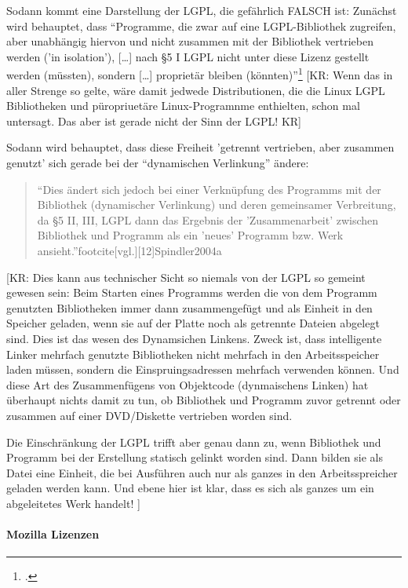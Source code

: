 \documentclass[DIV=calc,BCOR=5mm,11pt,headings=small,oneside,abstract=true, toc=bib]{scrartcl}
\begin{document}
Sodann kommt eine Darstellung der LGPL, die gefährlich FALSCH ist: Zunächst wird
behauptet, dass \enquote{Programme, die zwar auf eine LGPL-Bibliothek zugreifen,
aber unabhängig hiervon und nicht zusammen mit der Bibliothek vertrieben werden
('in isolation'), [\ldots] nach §5 I LGPL nicht unter diese
Lizenz gestellt werden (müssten), sondern [\ldots] proprietär
bleiben (könnten)}\footcite[vgl.][12]{Spindler2004a} [KR: Wenn das in
aller Strenge so gelte, wäre damit jedwede Distributionen, die die Linux LGPL
Bibliotheken und püropriuetäre Linux-Programnme enthielten, schon mal
untersagt. Das aber ist gerade nicht der Sinn der LGPL! KR]

Sodann wird behauptet, dass diese Freiheit 'getrennt vertrieben, aber zusammen
genutzt' sich gerade bei der \enquote{dynamischen Verlinkung} ändere: 
\begin{quote}\enquote{Dies ändert sich jedoch bei einer Verknüpfung des
Programms mit der Bibliothek (dynamischer Verlinkung) und deren
gemeinsamer Verbreitung, da §5 II, III, LGPL dann das Ergebnis der
'Zusammenarbeit' zwischen Bibliothek und Programm als ein 'neues'
Programm bzw. Werk ansieht.}footcite[vgl.][12]{Spindler2004a}
\end{quote}

[KR: Dies kann aus technischer Sicht so niemals von der LGPL so gemeint gewesen
sein: Beim Starten eines Programms werden die von dem Programm
genutzten Bibliotheken immer dann zusammengefügt und als Einheit in den Speicher
geladen, wenn sie auf der Platte noch als getrennte Dateien abgelegt sind. Dies
ist das wesen des Dynamsichen Linkens. Zweck ist, dass intelligente Linker
mehrfach genutzte Bibliotheken nicht mehrfach in den Arbeitsspeicher laden
müssen, sondern die Einspruingsadressen mehrfach verwenden können. Und diese Art
des Zusammenfügens von Objektcode (dynmaischens Linken) hat überhaupt nichts
damit zu tun, ob Bibliothek und Programm zuvor getrennt oder zusammen auf einer
DVD/Diskette vertrieben worden sind.

Die Einschränkung der LGPL trifft aber genau dann zu, wenn Bibliothek und
Programm bei der Erstellung statisch gelinkt worden sind. Dann bilden sie als
Datei eine Einheit, die bei Ausführen auch nur als ganzes in den
Arbeitsspreicher geladen werden kann. Und ebene hier ist klar, dass es sich als
ganzes um ein abgeleitetes Werk handelt!
 ]

\paragraph{Mozilla Lizenzen}
\end{document}
